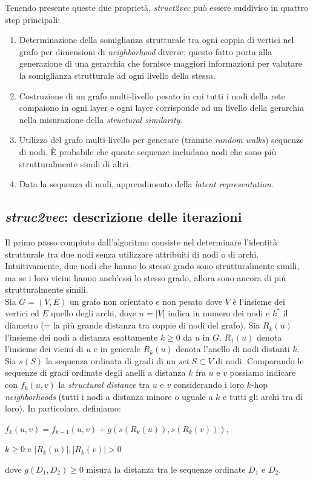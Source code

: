 \documentclass[11pt]{article}
\begin{document}
Tenendo presente queste due proprietà, \textit{struct2vec} può essere suddiviso in quattro step principali:
\begin{enumerate}
\setlength{\itemsep}{1pt}
  \setlength{\parskip}{0pt}
  \setlength{\parsep}{0pt}
  \item Determinazione della somiglianza strutturale tra ogni coppia di vertici nel grafo per dimensioni di \textit{neighborhood} diverse; questo fatto porta alla generazione di una gerarchia che fornisce maggiori informazioni per valutare la somiglianza strutturale ad ogni livello della stessa.
  \item Costruzione di un grafo multi-livello pesato in cui tutti i nodi della rete compaiono in ogni layer e ogni layer corrisponde ad un livello della gerarchia nella misurazione della \textit{structural similarity}.
  \item Utilizzo del grafo multi-livello per generare (tramite \textit{random walks}) sequenze di nodi. È probabile che queste sequenze includano nodi che sono più strutturalmente simili di altri.
  \item Data la sequenza di nodi, apprendimento della \textit{latent representation}.
\end{enumerate}

\subsection{\textit{struc2vec}: descrizione delle iterazioni}
Il primo passo compiuto dall'algoritmo consiste nel determinare l'identità strutturale tra due nodi senza utilizzare attribuiti di nodi o di archi. Intuitivamente, due nodi che hanno lo stesso grado sono strutturalmente simili, ma se i loro vicini hanno anch'essi lo stesso grado, allora sono ancora di più strutturalmente simili.\\

Sia $G = (V,E)$ un grafo non orientato e non pesato dove $V$ è l'insieme dei vertici ed $E$ quello degli archi, dove $n = |V|$ indica in numero dei nodi e $k^*$ il diametro (= la più grande distanza tra coppie di nodi del grafo). Sia $R_k(u)$ l'insieme dei nodi a distanza esattamente $k \geq 0$ da $u$ in $G$. $R_1(u)$ denota l'insieme dei vicini di $u$ e in generale $R_k(u)$ denota l'anello di nodi distanti $k$. Sia $s(S)$ la sequenza ordinata di gradi di un \textit{set} $S \subset V$ di nodi. Comparando le sequenze di gradi ordinate degli anelli a distanza $k$ fra $u$ e $v$ possiamo indicare con $f_k(u,v)$ la \textit{structural distance} tra $u$ e $v$ considerando i loro $k$-hop \textit{neighborhoods} (tutti i nodi a distanza minore o uguale a $k$ e tutti gli archi tra di loro). In particolare, definiamo:
\begin{center}
$f_k(u,v) = f_{k-1}(u,v) + g(s(R_k(u)),s(R_k(v)))$, 
\end{center}
\begin{center}
$k \geq 0$ e $|R_k(u)|, |R_k(v)| > 0$
\end{center}
dove $g(D_1,D_2) \geq 0$ misura la distanza tra le sequenze ordinate $D_1$ e $D_2$. 
\end{document}
